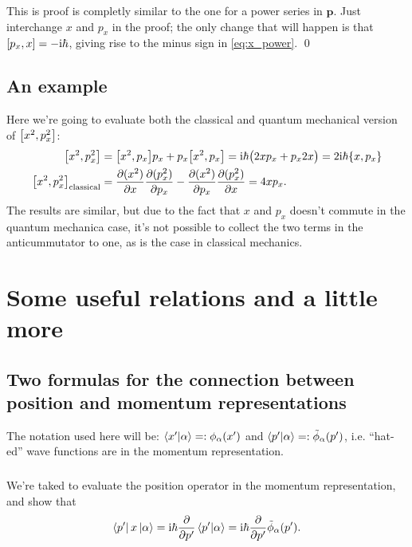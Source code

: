 \documentclass[11pt,letter, swedish, english
]{article}
\begin{document}
This is proof is completly similar to the one for a power series in
$\mathbf{p}$. Just interchange $x$ and $p_x$ in the proof; the only
change that will happen is that $\comm{p_x}{x}=-\ii\hbar$, giving rise
to the minus sign in \eqref{eq:x_power}.
\qed

\subsection{An example}
Here we're going to evaluate both the classical and quantum mechanical
version of $\comm{x^2}{p_x^2}$:
\begin{equation}
\begin{aligned}
\comm{x^2}{p_x^2} &= \comm{x^2}{p_x}p_x + p_x\comm{x^2}{p_x} 
= \ii\hbar \big( 2xp_x+p_x2x \big) = 2\ii\hbar\acomm{x}{p_x}\\
\comm{x^2}{p_x^2}_\text{classical} 
&= \pdv{(x^2)}{x}\pdv{(p_x^2)}{p_x} - \pdv{(x^2)}{p_x}\pdv{(p_x^2)}{x}
= 4xp_x.
\end{aligned}
\end{equation}
The results are similar, but due to the fact that $x$ and $p_x$
doesn't commute in the quantum mechanica case, it's not possible to
collect the two terms in the anticummutator to one, as is the case in
classical mechanics.



\section{Some useful relations and a little more}

\subsection{Two formulas for  the connection between position
  and momentum representations}

The notation used here will be: $\braket{x'}{\alpha}=:\phi_\alpha(x')$ and
$\braket{p'}{\alpha}=:\tilde\phi_\alpha(p')$, i.e. ``hat-ed'' wave
functions are in the momentum representation. 

\subsubsection{}\label{sec:5ai}
We're taked to evaluate the position operator in the momentum
representation, and show that 
\begin{equation}\label{eq:5_pxa}
\bra{p'}x\ket{\alpha} = \mathrm{i}\hbar \pdv{p'} \braket{p'}{\alpha} 
= \mathrm{i}\hbar \pdv{p'} \tilde\phi_\alpha(p').
\end{equation}
\end{document}
